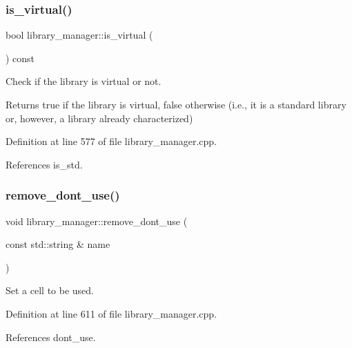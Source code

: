 \subsubsection{\texorpdfstring{is\+\_\+virtual()}{is\_virtual()}}
{\footnotesize\ttfamily bool library\+\_\+manager\+::is\+\_\+virtual (\begin{DoxyParamCaption}{ }\end{DoxyParamCaption}) const}



Check if the library is virtual or not. 

\begin{DoxyReturn}{Returns}
true if the library is virtual, false otherwise (i.\+e., it is a standard library or, however, a library already characterized) 
\end{DoxyReturn}


Definition at line 577 of file library\+\_\+manager.\+cpp.



References is\+\_\+std.

\mbox{\label{classlibrary__manager_a0cda95a89f54b1af796a67f7d871acc0}} 
\subsubsection{\texorpdfstring{remove\+\_\+dont\+\_\+use()}{remove\_dont\_use()}}
{\footnotesize\ttfamily void library\+\_\+manager\+::remove\+\_\+dont\+\_\+use (\begin{DoxyParamCaption}\item[{const std\+::string \&}]{name }\end{DoxyParamCaption})}



Set a cell to be used. 



Definition at line 611 of file library\+\_\+manager.\+cpp.



References dont\+\_\+use.

\mbox{\label{classlibrary__manager_a7ae8884cb2871b3cab0ea9b83dcb5829}} 
